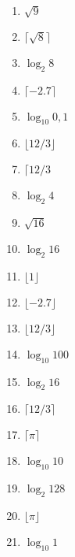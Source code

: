\documentclass[a4paper]{article}
\begin{document}
\begin{multicols}{3}
    \begin{enumerate}[label=\arabic*.]
        \item $\sqrt{9}$
        \item $\lceil{\sqrt{8}}\rceil$
        \item $\log_{2} 8$
        \item $\lceil{-2.7}\rceil$
        \item $\log_{10} 0{,}1$
        \item $\lfloor{12/3}\rfloor$
        \item $\lceil{12/3}$
        \item $\log_{2} 4$
        \item $\sqrt{16}$
        \item $\log_{2} 16$
        \item $\lfloor{1}\rfloor$
        \item $\lfloor{-2.7}\rfloor$
        \item $\lfloor{12/3}\rfloor$
        \item $\log_{10} 100$
        \item $\log_{2} 16$
        \item $\lceil{12/3}\rceil$
        \item $\lceil{\pi}\rceil$
        \item $\log_{10} 10 $
        \item $\log_{2} 128$
        \item $\lfloor{\pi}\rfloor$
        \item $\log_{10} 1$
    \end{enumerate}
\end{multicols}





\end{document}
